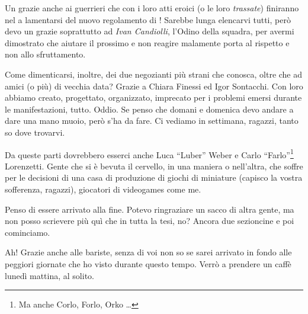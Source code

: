 Un grazie anche ai guerrieri che con i loro atti eroici (o le loro
\emph{trassate}) finiranno nel  a lamentarsi del nuovo
regolamento di ! Sarebbe lunga elencarvi tutti,
però devo un grazie soprattutto ad \emph{Ivan Candiolli}, l'Odino della
squadra, per avermi dimostrato che aiutare il prossimo e non reagire
malamente porta al rispetto e non allo sfruttamento.

Come dimenticarsi, inoltre, dei due negozianti più strani che conosca,
oltre che ad amici (o più) di vecchia data? Grazie a Chiara Finessi ed Igor
Sontacchi. Con loro abbiamo creato, progettato, organizzato, imprecato per
i problemi emersi durante le manifestazioni, tutto. Oddio. Se penso che
domani e domenica devo andare a dare una mano muoio, però s'ha da fare. Ci
vediamo in settimana, ragazzi, tanto so dove trovarvi.

Da queste parti dovrebbero esserci anche Luca ``Luber'' Weber e Carlo
``Farlo''\footnote{Ma anche Corlo, Forlo, Orko \dots{}} Lorenzetti. Gente
che si è bevuta il cervello, in una maniera o nell'altra, che soffre per le
decisioni di una casa di produzione di giochi di miniature (capisco la
vostra sofferenza, ragazzi), giocatori di videogames come me.

Penso di essere arrivato alla fine. Potevo ringraziare un sacco di altra
gente, ma non posso scrievere più quì che in tutta la tesi, no? Ancora due
sezioncine e poi cominciamo.

Ah! Grazie anche alle bariste, senza di voi non so se sarei arrivato in
fondo alle peggiori giornate che ho visto durante questo tempo. Verrò a
prendere un caffè lunedì mattina, al solito.

